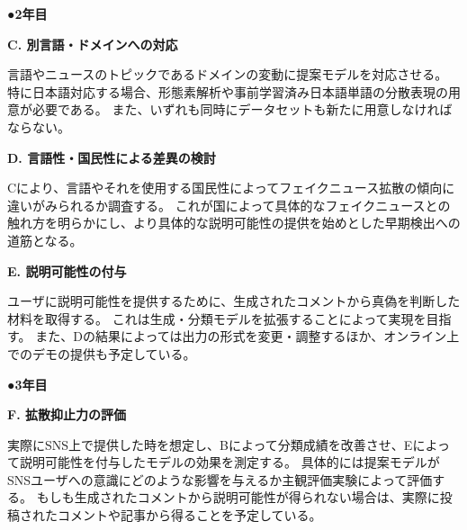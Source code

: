{	%


	\noindent
	●\textbf{2年目}

	\noindent
	\textbf{C. 別言語・ドメインへの対応}

	言語やニュースのトピックであるドメインの変動に提案モデルを対応させる。
	特に日本語対応する場合、形態素解析や事前学習済み日本語単語の分散表現の用意が必要である。
	また、いずれも同時にデータセットも新たに用意しなければならない。

	\noindent
	\textbf{D. 言語性・国民性による差異の検討}

	Cにより、言語やそれを使用する国民性によってフェイクニュース拡散の傾向に違いがみられるか調査する。
	これが国によって具体的なフェイクニュースとの触れ方を明らかにし、より具体的な説明可能性の提供を始めとした早期検出への道筋となる。

	\noindent
	\textbf{E. 説明可能性の付与}

	ユーザに説明可能性を提供するために、生成されたコメントから真偽を判断した材料を取得する。
	これは生成・分類モデルを拡張することによって実現を目指す。
	また、Dの結果によっては出力の形式を変更・調整するほか、オンライン上でのデモの提供も予定している。

	\noindent
	●\textbf{3年目}

	\noindent
	\textbf{F. 拡散抑止力の評価}

	実際にSNS上で提供した時を想定し、Bによって分類成績を改善させ、Eによって説明可能性を付与したモデルの効果を測定する。
	具体的には提案モデルがSNSユーザへの意識にどのような影響を与えるか主観評価実験によって評価する。
	もしも生成されたコメントから説明可能性が得られない場合は、実際に投稿されたコメントや記事から得ることを予定している。

}

